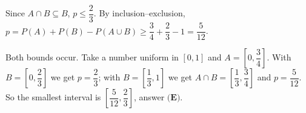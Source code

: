 Since $A\cap B\subseteq B$, $p\le\dfrac23$. By inclusion--exclusion, $p=P(A)+P(B)-P(A\cup B)\ge\dfrac34+\dfrac23-1=\dfrac{5}{12}$.

Both bounds occur. Take a number uniform in $[0,1]$ and $A=\left[0,\dfrac34\right]$. With $B=\left[0,\dfrac23\right]$ we get $p=\dfrac23$; with $B=\left[\dfrac13,1\right]$ we get $A\cap B=\left[\dfrac13,\dfrac34\right]$ and $p=\dfrac{5}{12}$. So the smallest interval is $\left[\dfrac{5}{12},\dfrac23\right]$, answer $\boxed{\textbf{(E)}}$.
